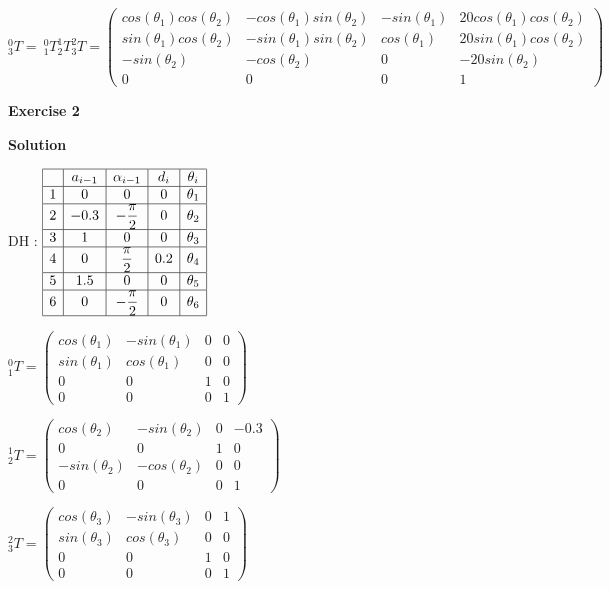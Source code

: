 \documentclass[8pt]{article}
\begin{document}
$^0_3T = \ ^0_1T ^1_2T ^2_3T = \left( \begin{array}{cccc}
cos(\theta_1) cos(\theta_2) & -cos(\theta_1) sin(\theta_2) & -sin(\theta_1) & 20cos(\theta_1) cos(\theta_2) \\
sin(\theta_1) cos(\theta_2) & - sin(\theta_1) sin(\theta_2) & cos(\theta_1) & 20 sin(\theta_1) cos(\theta_2) \\
-sin(\theta_2) & -cos(\theta_2) & 0 & -20 sin(\theta_2) \\
0 & 0 & 0 & 1
\end{array} \right) $

\textbf{Exercise 2}		
		
\textbf{Solution}

\medskip

\begin{list}{()~}{}
\item
DH :
$ \begin{array}{|c|c|c|c|c|}
\hline
& a_{i-1} & \alpha_{i-1} & d_i & \theta_i \\
\hline
1& 0 & 0 & 0 & \theta_1 \\
\hline
2& -0.3 & -\dfrac{\pi}{2} & 0 & \theta_2 \\
\hline
3& 1 & 0 & 0 & \theta_3 \\
\hline
4& 0 & \dfrac{\pi}{2} & 0.2 & \theta_4 \\
\hline
5& 1.5 & 0 & 0 & \theta_5 \\
\hline
6& 0 & -\dfrac{\pi}{2} & 0 & \theta_6\\
\hline
\end{array} $

$^0_1T = \left( \begin{array}{cccc}
cos(\theta_1) & -sin(\theta_1) & 0 & 0 \\
sin(\theta_1) & cos(\theta_1) & 0 & 0 \\
0 & 0 & 1 & 0 \\
0 & 0 & 0 & 1
\end{array} \right) $

$^1_2T = \left( \begin{array}{cccc}
cos(\theta_2) & -sin(\theta_2) & 0 & -0.3 \\
0 & 0 & 1 & 0 \\
-sin(\theta_2) & -cos(\theta_2) & 0 & 0 \\
0 & 0 & 0 & 1
\end{array} \right) $

$^2_3T = \left( \begin{array}{cccc}
cos(\theta_3) & -sin(\theta_3) & 0 & 1 \\
sin(\theta_3) & cos(\theta_3) & 0 & 0 \\
0 & 0 & 1 & 0 \\
0 & 0 & 0 & 1
\end{array} \right) $


\end{list}
\end{document}
